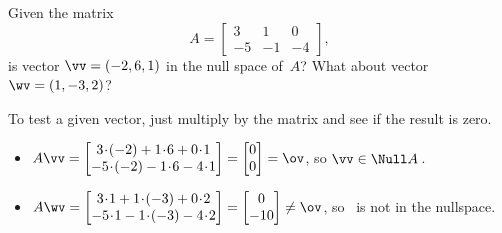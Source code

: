 \begin{example} \label{eg:}
Given the matrix
\begin{equation*}
A=\begin{bmatrix} 3&1&0
\\-5&-1&-4 \end{bmatrix},
\end{equation*}
is vector \(\vv=(-2,6,1)\) in the null space of~\(A\)?  
What about vector \(\wv=(1,-3,2)\)?
\begin{solution} 
To test a given vector, just multiply by the matrix and see if the result is zero.
\begin{itemize}
\item \(A\vv=\begin{bmatrix} 3\cdot(-2)+1\cdot6+0\cdot1
\\-5\cdot(-2)-1\cdot6-4\cdot1 \end{bmatrix}
=\begin{bmatrix} 0\\0 \end{bmatrix}=\ov\), so \(\vv\in\Null A\)\,.
\item \(A\wv=\begin{bmatrix} 3\cdot1+1\cdot(-3)+0\cdot2
\\-5\cdot1-1\cdot(-3)-4\cdot2 \end{bmatrix}
=\begin{bmatrix} 0\\-10 \end{bmatrix}\neq\ov\), so \wv~is not in the nullspace.
\end{itemize}
\end{solution}
\end{example}




